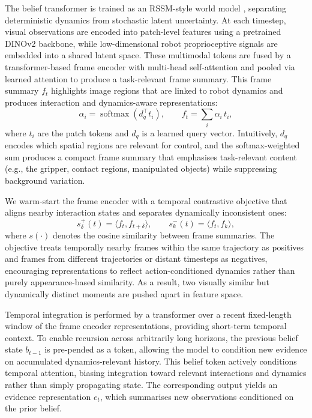 \documentclass[12pt]{article}
\begin{document}
The belief transformer is trained as an RSSM-style world model \cite{chen2022transdreamer,chaudhry2026semantic}, separating deterministic dynamics from stochastic latent uncertainty. At each timestep, visual observations are encoded into patch-level features using a pretrained DINOv2 \cite{oquab2023dinov2} backbone, while low-dimensional robot proprioceptive signals are embedded into a shared latent space. These multimodal tokens are fused by a transformer-based frame encoder with multi-head self-attention and pooled via learned attention to produce a task-relevant frame summary. This frame summary $f_t$ highlights image regions that are linked to robot dynamics and produces interaction and dynamics-aware representations:
\begin{equation}
\alpha_i = \operatorname{softmax}\!\left(d_q^\top t_i\right),
\qquad
f_t = \sum_i \alpha_i \, t_i ,
\end{equation}
where $t_i$ are the patch tokens and $d_q$ is a learned query vector. Intuitively, $d_q$ encodes which spatial regions are relevant for control, and the softmax-weighted sum produces a compact frame summary that emphasises task-relevant content (e.g., the gripper, contact regions, manipulated objects) while suppressing background variation.

We warm-start the frame encoder with a temporal contrastive objective that aligns nearby interaction states and separates dynamically inconsistent ones:
\begin{equation}
s^+_{\delta}(t) = \langle f_t, f_{t+\delta} \rangle,
\qquad
s^-_k(t) = \langle f_t, f_k \rangle ,
\end{equation}
where $s(\cdot)$ denotes the cosine similarity between frame summaries. The objective treats temporally nearby frames within the same trajectory as positives and frames from different trajectories or distant timesteps as negatives, encouraging representations to reflect action-conditioned dynamics rather than purely appearance-based similarity. As a result, two visually similar but dynamically distinct moments are pushed apart in feature space.

Temporal integration is performed by a transformer over a recent fixed-length window of the frame encoder representations, providing short-term temporal context. To enable recursion across arbitrarily long horizons, the previous belief state $b_{t-1}$ is pre-pended as a token, allowing the model to condition new evidence on accumulated dynamics-relevant history. This belief token actively conditions temporal attention, biasing integration toward relevant interactions and dynamics rather than simply propagating state. The corresponding output yields an evidence representation $e_t$, which summarises new observations conditioned on the prior belief.
\end{document}
